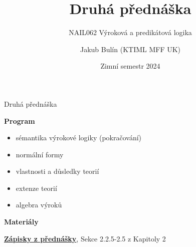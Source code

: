 \documentclass{beamer}
\title{Druhá přednáška}
\subtitle{NAIL062 Výroková a predikátová logika}
\author{Jakub Bulín (KTIML MFF UK)}
\date{Zimní semestr 2024}
\begin{document}
\maketitle


\begin{frame}{Druhá přednáška}

    \textbf{Program}
        \begin{itemize}
            \item sémantika výrokové logiky (pokračování)
            \item normální formy
            \item vlastnosti a důsledky teorií
            \item extenze teorií
            \item algebra výroků
        \end{itemize}   

    \textbf{Materiály}

        \href{https://github.com/jbulin-mff-uk/nail062/raw/main/lecture/lecture-notes/lecture-notes.pdf}{\alert{\textbf{Zápisky z přednášky}}}, Sekce 2.2.5-2.5 z Kapitoly 2

\end{frame}
\end{document}
